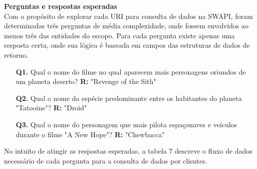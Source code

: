 \textbf{Perguntas e respostas esperadas} \\

Com o propósito de explorar cada URI para consulta de dados na SWAPI, foram determinadas três perguntas de média complexidade, onde fossem envolvidos ao menos três das entidades do escopo. Para cada pergunta existe apenas uma resposta certa, onde sua lógica é baseada em campos das estruturas de dados de retorno.

\begin{enumerate}
\item[\textbf{Q1.}] Qual o nome do filme no qual aparecem mais personagens oriundos de um planeta deserto? \textbf{R:} "Revenge of the Sith"
\item[\textbf{Q2.}] Qual o nome da espécie predominante entre os habitantes do planeta "Tatooine"? \textbf{R:} "Droid"
\item[\textbf{Q3.}] Qual o nome do personagem que mais pilota espaçonaves e veículos durante o filme "A New Hope"? \textbf{R:} "Chewbacca"
\end{enumerate}

No intuito de atingir as respostas esperadas, a tabela 7 descreve o fluxo de dados necessário de cada pergunta para a consulta de dados por clientes.

